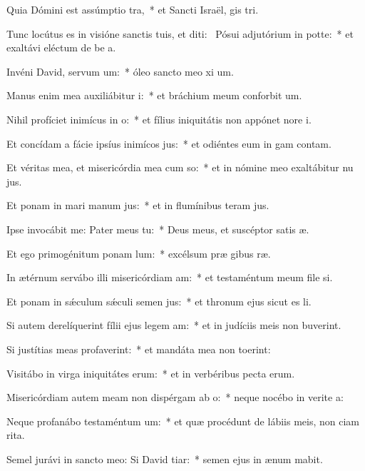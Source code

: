 \item Quia Dómini est assúmptio tra,~* et Sancti Israël, gis tri.
\item Tunc locútus es in visióne sanctis tuis, et diti:~\pscross{} Pósui adjutórium in potte:~* et exaltávi eléctum de be a.
\item Invéni David, servum um:~* óleo sancto meo xi um.
\item Manus enim mea auxiliábitur i:~* et bráchium meum conforbit um.
\item Nihil profíciet inimícus in o:~* et fílius iniquitátis non appónet nore i.
\item Et concídam a fácie ipsíus inimícos jus:~* et odiéntes eum in gam contam.
\item Et véritas mea, et misericórdia mea cum so:~* et in nómine meo exaltábitur nu jus.
\item Et ponam in mari manum jus:~* et in flumínibus teram jus.
\item Ipse invocábit me: Pater meus  tu:~* Deus meus, et suscéptor satis æ.
\item Et ego primogénitum ponam lum:~* excélsum præ gibus ræ.
\item In ætérnum servábo illi misericórdiam am:~* et testaméntum meum file si.
\item Et ponam in sǽculum sǽculi semen jus:~* et thronum ejus sicut es li.
\item Si autem derelíquerint fílii ejus legem am:~* et in judíciis meis non buverint.
\item Si justítias meas profaverint:~* et mandáta mea non toerint:
\item Visitábo in virga iniquitátes erum:~* et in verbéribus pecta erum.
\item Misericórdiam autem meam non dispérgam ab o:~* neque nocébo in verite a:
\item Neque profanábo testaméntum um:~* et quæ procédunt de lábiis meis, non ciam rita.
\item Semel jurávi in sancto meo: Si David tiar:~* semen ejus in ænum mabit.
